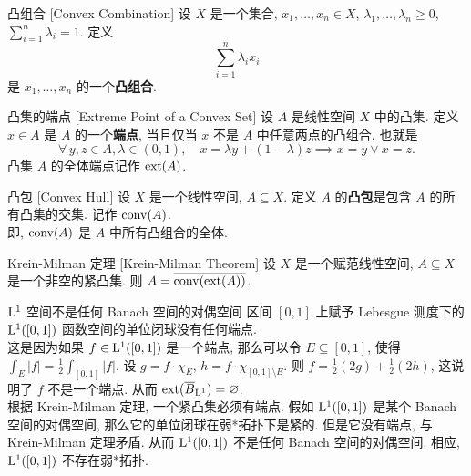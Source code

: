         \begin{dfn}
            {凸组合}
            [Convex Combination]
            设 \(X\) 是一个集合, \(x_1,\dots,x_n\in X\), \(\lambda_1,\dots,\lambda_n\geq 0\), \(\sum_{i=1}^n \lambda_i = 1\). 定义
            \[\sum_{i=1}^n \lambda_i x_i\]
            是 \(x_1,\dots,x_n\) 的一个\textbf{凸组合}.
        \end{dfn}

        \begin{dfn}
            {凸集的端点}
            [Extreme Point of a Convex Set]
            设 \(A\) 是线性空间 \(X\) 中的凸集. 定义 \(x\in A\) 是 \(A\) 的一个\textbf{端点}, 当且仅当 \(x\) 不是 \(A\) 中任意两点的凸组合. 也就是
            \[\forall\,y,z\in A, \lambda\in(0,1), \quad x = \lambda y + (1-\lambda) z \implies x = y \lor x = z.\]
            凸集 \(A\) 的全体端点记作 \(\operatorname{ext}(A)\).
        \end{dfn}

        \begin{dfn}
            {凸包}
            [Convex Hull]
            设 \(X\) 是一个线性空间, \(A\subseteq X\). 定义 \(A\) 的\textbf{凸包}是包含 \(A\) 的所有凸集的交集. 记作 \(\operatorname{conv}(A)\).\\
            即, \(\operatorname{conv}(A)\) 是 \(A\) 中所有凸组合的全体.
        \end{dfn}

        \begin{thm}
            {Krein-Milman 定理}
            [Krein-Milman Theorem]
            设 \(X\) 是一个赋范线性空间, \(A\subseteq X\) 是一个非空的紧凸集. 则 \(A = \overline{\operatorname{conv}(\operatorname{ext}(A))}\).
        \end{thm}

        \begin{cxmp}
            {\(\Lp[1]\) 空间不是任何 Banach 空间的对偶空间}
            区间 \([0,1]\) 上赋予 Lebesgue 测度下的 \(\Lp[1]([0,1])\) 函数空间的单位闭球没有任何端点. \\
            这是因为如果 \(f\in\Lp[1]([0,1])\) 是一个端点, 那么可以令 \(E\subseteq [0,1]\), 使得 \(\int_E|f|=\frac{1}{2}\int_{[0,1]}|f|\). 设 \(g = f\cdot \chi_E\), \(h = f\cdot \chi_{[0,1]\setminus E}\). 则 \(f = \frac{1}{2}(2g) + \frac{1}{2}(2h)\), 这说明了 \(f\) 不是一个端点. 从而 \(\ext(\overline{B}_{\Lp[1]})=\varnothing\). \\
            根据 Krein-Milman 定理, 一个紧凸集必须有端点. 假如 \(\Lp[1]([0,1])\) 是某个 Banach 空间的对偶空间, 那么它的单位闭球在弱*拓扑下是紧的. 但是它没有端点, 与 Krein-Milman 定理矛盾. 从而 \(\Lp[1]([0,1])\) 不是任何 Banach 空间的对偶空间. 相应, \(\Lp[1]([0,1])\) 不存在弱*拓扑.
        \end{cxmp}

